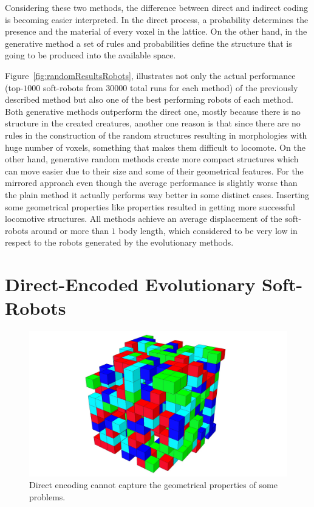 Considering these two methods, the difference between direct and indirect coding is becoming easier interpreted. In the direct process, a probability determines the presence and the material of every voxel in the lattice. On the other hand, in the generative method a set of rules and probabilities define the structure that is going to be produced into the available space.

Figure~\ref{fig:randomResultsRobots}, illustrates not only the actual performance (top-$1000$ soft-robots from $30000$ total runs for each method) of the previously described method but also one of the best performing robots of each method. Both generative methods outperform the direct one, mostly because there is no structure in the created creatures, another one reason is that since there are no rules in the construction of the random structures resulting in morphologies with huge number of voxels, something that makes them difficult to locomote. On the other hand, generative random methods create more compact structures which can move easier due to their size and some of their geometrical features. For the mirrored approach even though the average performance is slightly worse than the plain method it actually performs way better in some distinct cases. Inserting some geometrical properties like properties resulted in getting more successful locomotive structures. All methods achieve an average displacement of the soft-robots around or more than $1$ body length, which considered to be very low in respect to the robots generated by the evolutionary methods.

\section{Direct-Encoded Evolutionary Soft-Robots}

\begin{figure}
\centering
\includegraphics[height=0.2\textheight]{../Figures/Robots/direct.jpg}
\caption{Direct encoding cannot capture the geometrical properties of some problems.}
\label{fig:directRobot}
\end{figure}

